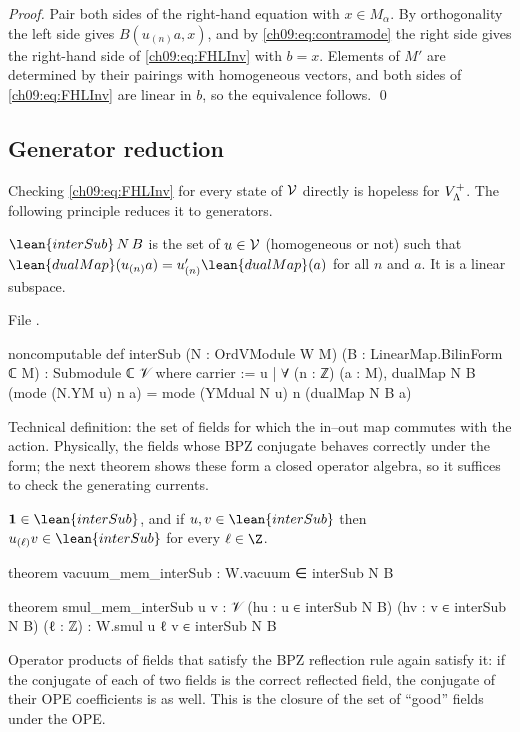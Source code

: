 \noindent\emph{Proof.} Pair both sides of the right-hand equation with $x\in M_\alpha$. By
orthogonality the left side gives $B(u_{(n)}a,x)$, and by \eqref{ch09:eq:contramode} the right side
gives the right-hand side of \eqref{ch09:eq:FHLInv} with $b=x$. Elements of $M'$ are determined by
their pairings with homogeneous vectors, and both sides of \eqref{ch09:eq:FHLInv} are linear in
$b$, so the equivalence follows. \qed

\subsection{Generator reduction}

Checking \eqref{ch09:eq:FHLInv} for every state of $\mathcal{V}$ directly is hopeless for $V_{\Lambda}^{+}$.
The following principle reduces it to generators.

\begin{definition}\label{ch09:def:interSub}
$\lean{interSub}\,N\,B$ is the set of $u\in\mathcal{V}$ (homogeneous or not) such that
$\lean{dualMap}(u_{(n)}a)=u'_{(n)}\lean{dualMap}(a)$ for all $n$ and $a$. It is a linear subspace.
\end{definition}
\noindent File .
\begin{leancode}
noncomputable def interSub (N : OrdVModule W M) (B : LinearMap.BilinForm ℂ M) : Submodule ℂ 𝒱 where
  carrier := {u | ∀ (n : ℤ) (a : M),
    dualMap N B (mode (N.YM u) n a) = mode (YMdual N u) n (dualMap N B a)}
\end{leancode}

\begin{physics}
Technical definition: the set of fields for which the in--out map commutes with the action. Physically, the fields whose BPZ conjugate behaves correctly under the form; the next theorem shows these form a closed operator algebra, so it suffices to check the generating currents.
\end{physics}

\begin{theorem}\label{ch09:thm:interSub}
$\mathbf1\in\lean{interSub}$, and if $u,v\in\lean{interSub}$ then $u_{(\ell)}v\in\lean{interSub}$
for every $\ell\in\Z$.
\end{theorem}
\begin{leancode}
theorem vacuum_mem_interSub : W.vacuum ∈ interSub N B

theorem smul_mem_interSub {u v : 𝒱} (hu : u ∈ interSub N B) (hv : v ∈ interSub N B) (ℓ : ℤ) :
    W.smul u ℓ v ∈ interSub N B
\end{leancode}
\begin{physics}
Operator products of fields that satisfy the BPZ reflection rule again satisfy it: if the conjugate of each of two fields is the correct reflected field, the conjugate of their OPE coefficients is as well. This is the closure of the set of ``good'' fields under the OPE.
\end{physics}

